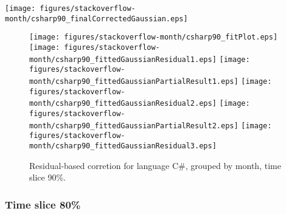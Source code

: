 \begin{center}
{\texttt{[image: figures/stackoverflow-month/csharp90\_finalCorrectedGaussian.eps]}}
\end{center}

\FloatBarrier

\begin{figure}[t]
\centering
{}
{\texttt{[image: figures/stackoverflow-month/csharp90\_fitPlot.eps]}}
{\texttt{[image: figures/stackoverflow-month/csharp90\_fittedGaussianResidual1.eps]}}
{\texttt{[image: figures/stackoverflow-month/csharp90\_fittedGaussianPartialResult1.eps]}}
{\texttt{[image: figures/stackoverflow-month/csharp90\_fittedGaussianResidual2.eps]}}
{\texttt{[image: figures/stackoverflow-month/csharp90\_fittedGaussianPartialResult2.eps]}}
{\texttt{[image: figures/stackoverflow-month/csharp90\_fittedGaussianResidual3.eps]}}
\caption{Residual-based corretion for language C\#, grouped by month, time slice 90\%.}
\end{figure}


\FloatBarrier


\subsubsection{Time slice 80\%}

